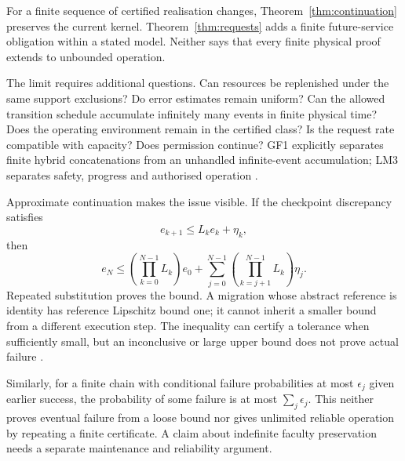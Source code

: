 For a finite sequence of certified realisation changes, Theorem~\ref{thm:continuation} preserves the current kernel. Theorem~\ref{thm:requests} adds a finite future-service obligation within a stated model. Neither says that every finite physical proof extends to unbounded operation.

The limit requires additional questions. Can resources be replenished under the same support exclusions? Do error estimates remain uniform? Can the allowed transition schedule accumulate infinitely many events in finite physical time? Does the operating environment remain in the certified class? Is the request rate compatible with capacity? Does permission continue? GF1 explicitly separates finite hybrid concatenations from an unhandled infinite-event accumulation; LM3 separates safety, progress and authorised operation \cite[\S10.12]{GF1}\cite[\S18]{LM3}.

Approximate continuation makes the issue visible. If the checkpoint discrepancy satisfies
\begin{equation}
e_{k+1}\le L_ke_k+\eta_k,
\end{equation}
then
\begin{equation}
e_N\le\left(\prod_{k=0}^{N-1}L_k\right)e_0+
\sum_{j=0}^{N-1}\left(\prod_{k=j+1}^{N-1}L_k\right)\eta_j.
\label{eq:error}
\end{equation}
Repeated substitution proves the bound. A migration whose abstract reference is identity has reference Lipschitz bound one; it cannot inherit a smaller bound from a different execution step. The inequality can certify a tolerance when sufficiently small, but an inconclusive or large upper bound does not prove actual failure \cite[\S14.2--14.4]{LM3}.

Similarly, for a finite chain with conditional failure probabilities at most \(\epsilon_j\) given earlier success, the probability of some failure is at most \(\sum_j\epsilon_j\). This neither proves eventual failure from a loose bound nor gives unlimited reliable operation by repeating a finite certificate. A claim about indefinite faculty preservation needs a separate maintenance and reliability argument.
